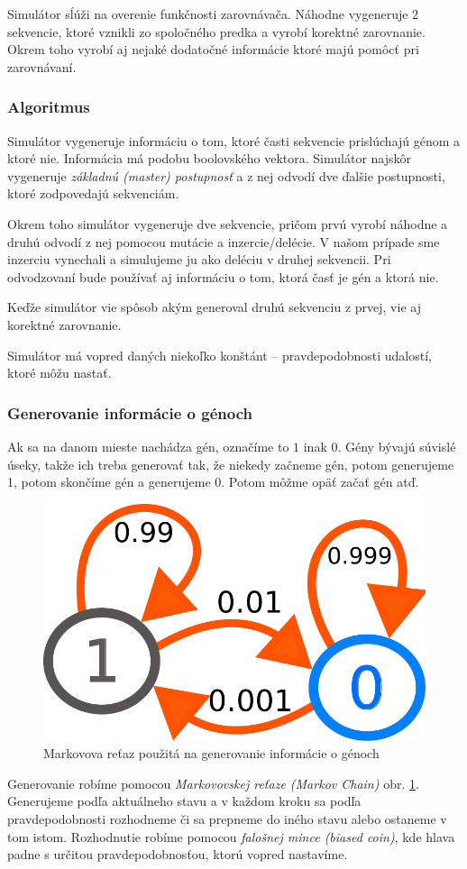 Simulátor sĺúži na overenie funkčnosti zarovnávača. Náhodne vygeneruje 2 sekvencie, ktoré vznikli zo spoločného predka a vyrobí korektné zarovnanie. Okrem toho vyrobí aj nejaké dodatočné informácie ktoré majú pomôcť pri zarovnávaní.

\subsubsection{Algoritmus}
Simulátor vygeneruje informáciu o tom, ktoré časti sekvencie prislúchajú génom a ktoré nie. Informácia má podobu boolovského vektora.
Simulátor najskôr vygeneruje \textit{základnú (master) postupnosť} a z nej odvodí dve ďalšie postupnosti, ktoré zodpovedajú sekvenciám.

Okrem toho simulátor vygeneruje dve sekvencie, pričom prvú vyrobí náhodne a druhú odvodí z nej pomocou mutácie a inzercie/delécie.
V našom prípade sme inzerciu vynechali a simulujeme ju ako deléciu v druhej sekvencii.
Pri odvodzovaní bude používať aj informáciu o tom, ktorá časť je gén a ktorá nie.

Keďže simulátor vie spôsob akým generoval druhú sekvenciu z prvej, vie aj korektné zarovnanie.

Simulátor má vopred daných niekoľko konštánt -- pravdepodobnosti udalostí, ktoré môžu nastať.

\subsubsection{Generovanie informácie o génoch}
Ak sa na danom mieste nachádza gén, označíme to $1$ inak $0$.
Gény bývajú súvislé úseky, takže ich treba generovať tak, že niekedy začneme gén, potom generujeme 1, potom skončíme gén a generujeme 0. Potom môžme opäť začať gén atď.

\begin{figure}[htp]
    \centering
    \includegraphics[width=.3\textwidth]{images/markov_chain}
    \caption{Markovova reťaz použitá na generovanie informácie o génoch}
    \label{fig:markov-chain}
\end{figure}

Generovanie robíme pomocou \textit{Markovovskej reťaze (Markov Chain)} obr. \ref{fig:markov-chain}. Generujeme podľa aktuálneho stavu a v každom kroku sa podľa pravdepodobnosti rozhodneme či sa prepneme do iného stavu alebo ostaneme v tom istom. Rozhodnutie robíme pomocou \textit{falošnej mince (biased coin)}, kde hlava padne s určitou pravdepodobnosťou, ktorú vopred nastavíme.

